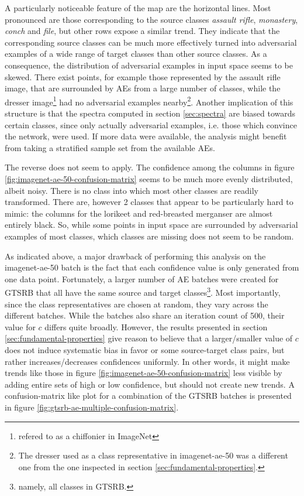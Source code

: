 \documentclass[11pt, a4paper]{article}
\begin{document}
A particularly noticeable feature of the map are the horizontal lines. Most pronounced are those corresponding to the source classes \emph{assault rifle}, \emph{monastery}, \emph{conch} and \emph{file}, but other rows expose a similar trend. They indicate that the corresponding source classes can be much more effectively turned into adversarial examples of a wide range of target classes than other source classes. As a consequence, the distribution of adversarial examples in input space seems to be skewed. There exist points, for example those represented by the assault rifle image, that are surrounded by AEs from a large number of classes, while the dresser image\footnote{refered to as a chiffonier in ImageNet} had no adversarial examples nearby\footnote{The dresser used as a class representative in imagenet-ae-50 was a different one from the one inspected in section \ref{sec:fundamental-properties}.}. Another implication of this structure is that the spectra computed in section \ref{sec:spectra} are biased towards certain classes, since only actually adversarial examples, i.e. those which convince the network, were used. If more data were available, the analysis might benefit from taking a stratified sample set from the available AEs.

The reverse does not seem to apply. The confidence among the columns in figure \ref{fig:imagenet-ae-50-confusion-matrix} seems to be much more evenly distributed, albeit noisy. There is no class into which most other classes are readily transformed. There are, however 2 classes that appear to be particularly hard to mimic: the columns for the lorikeet and red-breasted merganser are almost entirely black. So, while some points in input space are surrounded by adversarial examples of most classes, which classes are missing does not seem to be random. 

As indicated above, a major drawback of performing this analysis on the imagenet-ae-50 batch is the fact that each confidence value is only generated from one data point. Fortunately, a larger number of AE batches were created for GTSRB that all have the same source and target classes\footnote{namely, all classes in GTSRB.}. Most importantly, since the class representatives are chosen at random, they vary across the different batches. While the batches also share an iteration count of 500, their value for $c$ differs quite broadly. However, the results presented in section \ref{sec:fundamental-properties} give reason to believe that a larger/smaller value of $c$ does not induce systematic bias in favor or some source-target class pairs, but rather increases/decreases confidences uniformly. In other words, it might make trends like those in figure \ref{fig:imagenet-ae-50-confusion-matrix} less visible by adding entire sets of high or low confidence, but should not create new trends. A confusion-matrix like plot for a combination of the GTSRB batches is presented in figure \ref{fig:gtsrb-ae-multiple-confusion-matrix}.
\end{document}
